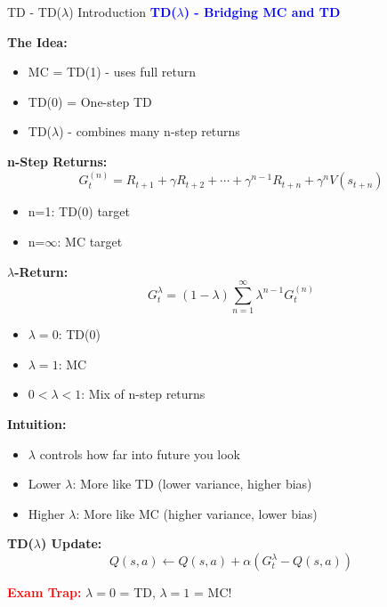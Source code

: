 \documentclass[8pt]{beamer}
\begin{document}
\begin{frame}{TD - TD($\lambda$) Introduction}
\fontsize{6.5}{7.5}\selectfont
\textcolor{blue}{\textbf{TD($\lambda$) - Bridging MC and TD}}

\textbf{The Idea:}
\begin{itemize}
\item MC = TD(1) - uses full return
\item TD(0) = One-step TD
\item TD($\lambda$) - combines many n-step returns
\end{itemize}

\textbf{n-Step Returns:}
\[
G_t^{(n)} = R_{t+1} + \gamma R_{t+2} + \cdots + \gamma^{n-1}R_{t+n} + \gamma^n V(s_{t+n})
\]
\begin{itemize}
\item n=1: TD(0) target
\item n=$\infty$: MC target
\end{itemize}

\textbf{$\lambda$-Return:}
\[
G_t^\lambda = (1-\lambda)\sum_{n=1}^{\infty} \lambda^{n-1} G_t^{(n)}
\]
\begin{itemize}
\item $\lambda = 0$: TD(0)
\item $\lambda = 1$: MC
\item $0 < \lambda < 1$: Mix of n-step returns
\end{itemize}

\textbf{Intuition:}
\begin{itemize}
\item $\lambda$ controls how far into future you look
\item Lower $\lambda$: More like TD (lower variance, higher bias)
\item Higher $\lambda$: More like MC (higher variance, lower bias)
\end{itemize}

\textbf{TD($\lambda$) Update:}
\[
Q(s,a) \leftarrow Q(s,a) + \alpha(G_t^\lambda - Q(s,a))
\]

\textcolor{red}{\textbf{Exam Trap:}} $\lambda=0$ = TD, $\lambda=1$ = MC!
\end{frame}
\end{document}
